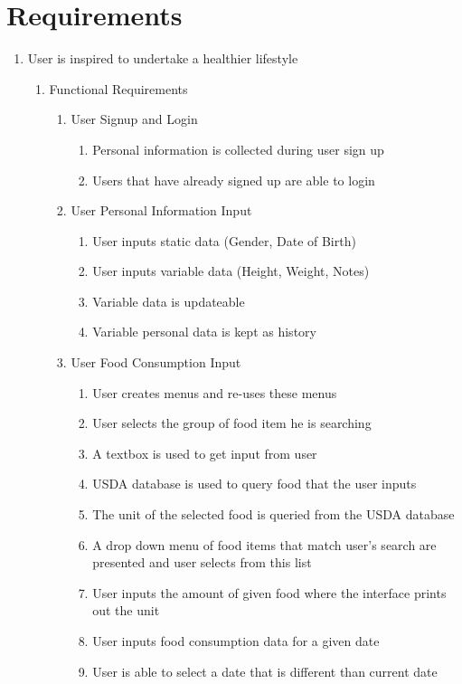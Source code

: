 \section{Requirements}

\begin{enumerate}
\item User is inspired to undertake a healthier lifestyle
	\begin{enumerate}
	\item Functional Requirements
		\begin{enumerate}
		\item User Signup and Login
			\begin{enumerate}
			\item Personal information is collected during user sign up
			\item Users that have already signed up are able to login
			\end{enumerate}
		\item User Personal Information Input
			\begin{enumerate}
			\item User inputs static data (Gender, Date of Birth)
			\item User inputs variable data (Height, Weight, Notes)
			\item Variable data is updateable
			\item Variable personal data is kept as history
			\end{enumerate}
		\item User Food Consumption Input
			\begin{enumerate}
			\item User creates menus and re-uses these menus
			\item User selects the group of food item he is searching
			\item A textbox is used to get input from user
			\item USDA database is used to query food that the user inputs
			\item The unit of the selected food is queried from the USDA database
			\item A drop down menu of food items that match user’s search are  presented and user selects from this list
			\item User inputs the amount of given food where the interface prints out the unit
			\item User inputs food consumption data for a given date
			\item User is able to select a date that is different than current date

\end{enumerate}
\end{enumerate}
\end{enumerate}
\end{enumerate}
